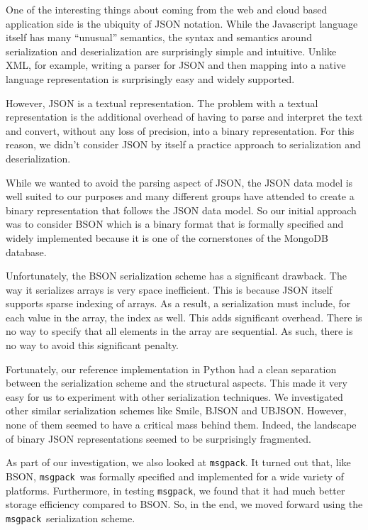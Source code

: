 \documentclass[11pt,a4paper,twocolumn]{article}
\newcommand{\msgpack}{\texttt{msgpack}}
\begin{document}
One of the interesting things about coming from the web and cloud
based application side is the ubiquity of JSON notation.  While the
Javascript language itself has many ``unusual'' semantics, the syntax
and semantics around serialization and deserialization are
surprisingly simple and intuitive.  Unlike XML, for example, writing a
parser for JSON and then mapping into a native language representation
is surprisingly easy and widely supported.

However, JSON is a textual representation.  The problem with a textual
representation is the additional overhead of having to parse and
interpret the text and convert, without any loss of precision, into a
binary representation.  For this reason, we didn't consider JSON by
itself a practice approach to serialization and deserialization.

While we wanted to avoid the parsing aspect of JSON, the JSON data
model \cite{JSON} is well suited to our purposes and many different
groups have attended to create a binary representation that follows
the JSON data model.  So our initial approach was to consider BSON
\cite{BSON} which is a binary format that is formally specified and
widely implemented because it is one of the cornerstones of the
MongoDB database\cite{MongoDB}.

Unfortunately, the BSON serialization scheme has a significant
drawback.  The way it serializes arrays is very space inefficient.
This is because JSON itself supports sparse indexing of arrays.  As a
result, a serialization must include, for each value in the array, the
index as well.  This adds significant overhead.  There is no way to
specify that all elements in the array are sequential.  As such, there
is no way to avoid this significant penalty.

Fortunately, our reference implementation in Python\cite{pyRecon} had
a clean separation between the serialization scheme and the structural
aspects.  This made it very easy for us to experiment with other
serialization techniques.  We investigated other similar serialization
schemes like Smile\cite{Smile}, BJSON\cite{BJSON} and
UBJSON\cite{UBJSON}.  However, none of them seemed to have a critical
mass behind them.  Indeed, the landscape of binary JSON
representations seemed to be surprisingly fragmented.

As part of our investigation, we also looked at \msgpack.  It turned
out that, like BSON, \msgpack\ was formally specified and implemented
for a wide variety of platforms\cite{MsgPack}.  Furthermore, in
testing \msgpack, we found that it had much better storage efficiency
compared to BSON.  So, in the end, we moved forward using the
\msgpack\ serialization scheme.
\end{document}
